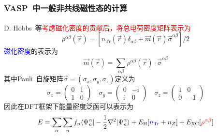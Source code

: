 \documentclass[cjk,slidestop,compress,mathserif,blue]{beamer}
\newcommand{\upcite}[1]{\hspace{0ex}\textsuperscript{\cite{#1}}} %
\begin{document}
\frame
{
	\frametitle{\textrm{VASP~}中一般非共线磁性态的计算}
	\textrm{D. Hobbs~}等\upcite{PRB62-11556_2000}\textcolor{red}{考虑磁化密度的贡献后，将总电荷密度矩阵表示为}
	\begin{displaymath}
		\rho^{\alpha\beta}(\vec r)=\left[n_{\mathrm{Tr}}(\vec r)\delta_{\alpha\beta}+\vec m(\vec r)\vec{\sigma}^{\alpha\beta}\right]/2
	\end{displaymath}
	\textcolor{blue}{磁化密度}的表示为
	\begin{displaymath}
		\vec m(\vec r)=\sum_{\alpha\beta}\rho^{\alpha\beta}(\vec r)\cdot\vec{\sigma}^{\alpha\beta}
	\end{displaymath}
	其中\textrm{Pauli~}自旋矩阵$\vec{\sigma}=(\sigma_x,\sigma_y,\sigma_z)$定义为
	\begin{displaymath}
		\sigma_x=\left( 
		\begin{matrix}
			0 &1\\
			1 &0
		\end{matrix}
		\right)\quad
		\sigma_y=\left( 
		\begin{matrix}
			0 &-\mathrm{i}\\
			\mathrm{i} &0
		\end{matrix}
		\right)\quad
		\sigma_z=\left( 
		\begin{matrix}
			1 &0\\
			0 &-1
		\end{matrix}
		\right)
	\end{displaymath}
	因此在\textrm{DFT}框架下能量密度泛函可以表示为
	\begin{displaymath}
		E=\sum_{\alpha}\sum_{n}f_n\langle\Psi_n^{\alpha}|-\frac12\nabla^2|\Psi_n^{\alpha}\rangle+E_{\mathrm{H}}[\textcolor{blue}{n_{\mathrm{Tr}}}+n_Z]+E_{\mathrm{XC}}[\textcolor{red}{\rho^{\alpha\beta}}]
	\end{displaymath}
}
\end{document}
